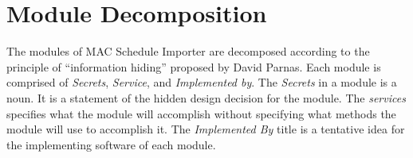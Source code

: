 \documentclass[12pt, titlepage]{article}
\begin{document}




\section{Module Decomposition} \label{SecMD}

The modules of MAC Schedule Importer are decomposed according to the principle of ``information hiding''
proposed by David Parnas. Each module is comprised of \emph{Secrets}, \emph{Service}, and \emph{Implemented by}.  The \emph{Secrets} in a module is a noun. It is a statement of the hidden design decision for the module. The \emph{services} specifies what the module will accomplish without specifying what methods the module will use to accomplish it. The  \emph{Implemented By} title is a tentative idea for the implementing software of each module.

\end{document}
